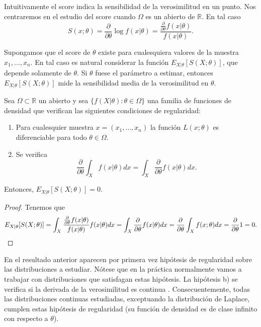 \documentclass{article}
\begin{document}
    Intuitivamente el score indica la sensibilidad de la verosimilitud en un punto. Nos centraremos en el estudio del score cuando $\Omega$ es un abierto de $\mathbb{R}$. En tal caso
    \[S(x; \theta) = \frac{\partial}{\partial \theta} \log f(x | \theta) = \frac{\frac{\partial}{\partial \theta} f(x | \theta)}{f(x | \theta)}.\]

    Supongamos que el score de $\theta$ existe para cualesquiera valores de la muestra $x_1, \ldots, x_n$. En tal caso es natural considerar la función $E_{X|\theta}[S(X;\theta)]$, que depende solamente de $\theta$. Si $\theta$ fuese el parámetro a estimar, entonces $E_{X|\theta}[S(X;\theta)]$ mide la sensibilidad media de la verosimilitud en $\theta$.

    \begin{lem} \label{lem:score:esp}
        Sea $\Omega \subset \mathbb{R}$ un abierto y sea $\{f(X|\theta): \theta \in \Omega\}$ una familia de funciones de densidad que verifican las siguientes condiciones de regularidad:
        \begin{enumerate}
            \item Para cualesquier muestra $x=(x_1, \ldots, x_n)$ la función $L(x; \theta)$ es diferenciable para todo $\theta \in \Omega$.
            \item Se verifica
            \[\frac{\partial}{\partial \theta}\int_{X} f(x| \theta) dx = \int_{X} \frac{\partial}{\partial \theta} f(x| \theta) dx.\]
        \end{enumerate}
        Entonces, $E_{X|\theta}[S(X;\theta)] = 0$.
    \end{lem}
    \begin{proof}
        Tenemos que
        \[E_{X|\theta}[S(X;\theta)] = \int_{X} \frac{\frac{\partial}{\partial \theta} f(x | \theta)}{f(x | \theta)}  f(x | \theta) dx = \int_{X} \frac{\partial}{\partial \theta} f(x | \theta) dx = \frac{\partial}{\partial \theta} \int_{X} f(x; \theta) dx = \frac{\partial}{\partial \theta} 1 = 0. \qedhere\]
    \end{proof}

    En el resultado anterior aparecen por primera vez hipótesis de regularidad sobre las distribuciones a estudiar. Nótese que en la práctica normalmente vamos a trabajar con distribuciones que satisfagan estas hipótesis. La hipótesis b) se verifica si la derivada de la verosimilitud es continua \cite{leibniz}. Consecuentemente, todas las distribuciones continuas estudiadas, exceptuando la distribución de Laplace, cumplen estas hipótesis de regularidad (su función de densidad es de clase infinito con respecto a $\theta$).
\end{document}
